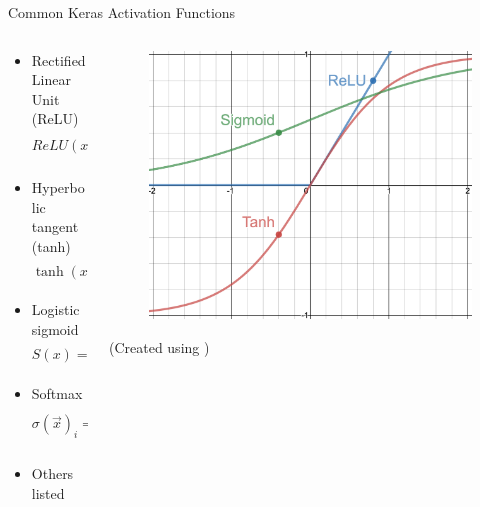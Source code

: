 \documentclass{beamer}
\newcommand{\blue}[1]{\color{blue}{#1}}
\begin{document}
	\begin{frame}{Common Keras Activation Functions}
	\begin{columns}
	\begin{column}{0.5\textwidth}
	\begin{itemize}
		\setlength{\abovedisplayskip}{1ex}
		\setlength{\belowdisplayskip}{1ex}
		\item Rectified Linear Unit (ReLU)
		\[ ReLU(x) =
		\begin{cases}
		x & \text{ if } x \geq 0 \\
		0 & \text{ else}
		\end{cases} \]
		\item Hyperbolic tangent (tanh)
		\[ \tanh(x) = \frac{e^x - e^{-x}}{e^x + e^{-x}} \]
		\item Logistic sigmoid
		\[ S(x) = \frac{1}{1 + e^{-x}} \]
		\item Softmax
		\[ \sigma(\vec{x})_i = \frac{e^{\vec{x}_i}}{\sum_{j=1}^n e^{\vec{x}_i}} \text{ for } \vec{x} \in \mathbb{R}^n \]
		\item Others listed \href{https://keras.io/activations/}{\blue{here}}
	\end{itemize}
	\end{column}
	\begin{column}{0.5\textwidth}
		\begin{figure}
			\includegraphics[width=\textwidth]{activations}
		\end{figure}
		\begin{center}
		(Created using \href{https://www.desmos.com/calculator}{\blue{Desmos}})
		\end{center}
	\end{column}
	\end{columns}
	\end{frame}
\end{document}
